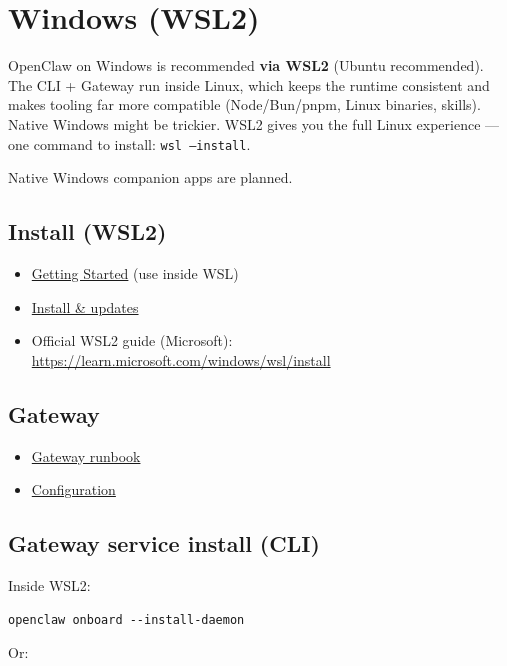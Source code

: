 \section{Windows (WSL2)}


OpenClaw on Windows is recommended \textbf{via WSL2} (Ubuntu recommended). The
CLI + Gateway run inside Linux, which keeps the runtime consistent and makes
tooling far more compatible (Node/Bun/pnpm, Linux binaries, skills). Native
Windows might be trickier. WSL2 gives you the full Linux experience — one command
to install: \texttt{wsl --install}.

Native Windows companion apps are planned.

\subsection{Install (WSL2)}


\begin{itemize}
  \item \href{/start/getting-started}{Getting Started} (use inside WSL)
  \item \href{/install/updating}{Install \& updates}
  \item Official WSL2 guide (Microsoft): \href{https://learn.microsoft.com/windows/wsl/install}{https://learn.microsoft.com/windows/wsl/install}
\end{itemize}


\subsection{Gateway}


\begin{itemize}
  \item \href{/gateway}{Gateway runbook}
  \item \href{/gateway/configuration}{Configuration}
\end{itemize}


\subsection{Gateway service install (CLI)}


Inside WSL2:

\begin{lstlisting}
openclaw onboard --install-daemon
\end{lstlisting}


Or:

